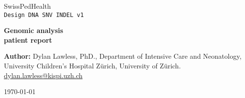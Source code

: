 
\begin{titlepage}
    \begin{minipage}[t]{0.66\textwidth}
        \raggedright
    \end{minipage}
    \hfill
    \begin{minipage}[t]{0.33\textwidth}
        \raggedleft %
        \fontsize{10}{12}\selectfont
        SwissPedHealth\\
        \texttt{Design DNA SNV INDEL v1}
    \end{minipage}

    \vspace*{\fill} %

    {\centering %
    \fontsize{38}{46}\selectfont\textbf{Genomic analysis\\patient report}\par} %
    
    \vspace*{\fill} %

    \noindent %
    \begin{minipage}[b]{0.26\textwidth}
        \raggedright
        \fontsize{10}{12}\selectfont
        \textbf{Author:}
        Dylan Lawless, PhD., 
        Department of Intensive Care and Neonatology, 
        University Children's Hospital Zürich, 
        University of Zürich.\\
        \href{mailto:dylan.lawless@kispi.uzh.ch}{dylan.lawless@kispi.uzh.ch}
    \end{minipage}
    
    \hfill
        \begin{minipage}[t]{0.73\textwidth}
        \raggedleft
    \end{minipage}


    \centering
    \normalsize
    \today
{}
    
\end{titlepage}
